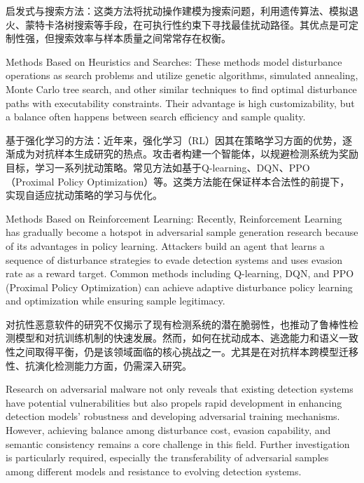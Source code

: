 启发式与搜索方法：这类方法将扰动操作建模为搜索问题，利用遗传算法\cite{wang2022black}、模拟退火\cite{bertsimas1993simulated}、蒙特卡洛树搜索\cite{chaslot2010monte}等手段，在可执行性约束下寻找最佳扰动路径。其优点是可定制性强，但搜索效率与样本质量之间常常存在权衡。

Methods Based on Heuristics and Searches: These methods model disturbance operations as search problems and utilize genetic algorithms\cite{wang2022black}, simulated annealing\cite{bertsimas1993simulated}, Monte Carlo tree search\cite{chaslot2010monte}, and other similar techniques to find optimal disturbance paths with executability constraints. Their advantage is high customizability, but a balance often happens between search efficiency and sample quality.

基于强化学习的方法：近年来，强化学习（RL）因其在策略学习方面的优势，逐渐成为对抗样本生成研究的热点。攻击者构建一个智能体，以规避检测系统为奖励目标，学习一系列扰动策略。常见方法如基于Q-learning\cite{watkins1992q}、DQN\cite{osband2016deep}、PPO\cite{yu2022surprising}（Proximal Policy Optimization）等。这类方法能在保证样本合法性的前提下，实现自适应扰动策略的学习与优化。

Methods Based on Reinforcement Learning: Recently, Reinforcement Learning has gradually become a hotspot in adversarial sample generation research because of its advantages in policy learning. Attackers build an agent that learns a sequence of disturbance strategies to evade detection systems and uses evasion rate as a reward target. Common methods including Q-learning\cite{watkins1992q}, DQN\cite{osband2016deep}, and PPO \cite{yu2022surprising}(Proximal Policy Optimization) can achieve adaptive disturbance policy learning and optimization while ensuring sample legitimacy.

对抗性恶意软件的研究不仅揭示了现有检测系统的潜在脆弱性，也推动了鲁棒性检测模型和对抗训练机制的快速发展。然而，如何在扰动成本、逃逸能力和语义一致性之间取得平衡，仍是该领域面临的核心挑战之一。尤其是在对抗样本跨模型迁移性、抗演化检测能力方面，仍需深入研究。

Research on adversarial malware not only reveals that existing detection systems have potential vulnerabilities but also propels rapid development in enhancing detection models’ robustness and developing adversarial training mechanisms. However, achieving balance among disturbance cost, evasion capability, and semantic consistency remains a core challenge in this field. Further investigation is particularly required, especially the transferability of adversarial samples among different models and resistance to evolving detection systems.  

